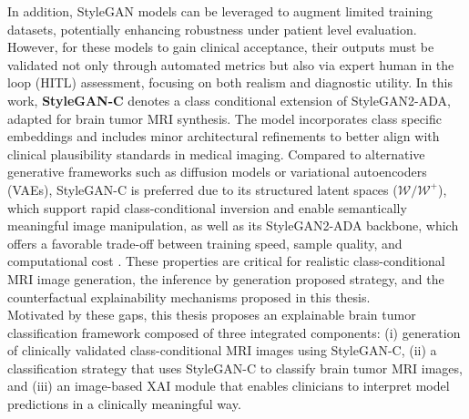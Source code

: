 In addition, StyleGAN models can be leveraged to augment limited training datasets, potentially enhancing robustness under patient level evaluation. However, for these models to gain clinical acceptance, their outputs must be validated not only through automated metrics but also via expert human in the loop (HITL) assessment, focusing on both realism and diagnostic utility. In this work, \textbf{StyleGAN-C} denotes a class conditional extension of StyleGAN2-ADA, adapted for brain tumor MRI synthesis. The model incorporates class specific embeddings and includes minor architectural refinements to better align with clinical plausibility standards in medical imaging. Compared to alternative generative frameworks such as diffusion models or variational autoencoders (VAEs), StyleGAN-C is preferred due to its structured latent spaces ($\mathcal{W}/\mathcal{W}^+$), which support rapid class-conditional inversion and enable semantically meaningful image manipulation, as well as its StyleGAN2-ADA backbone, which offers a favorable trade-off between training speed, sample quality, and computational cost \cite{abdullah2025computationallyefficientdiffusionmodels}.
These properties are critical for realistic class-conditional MRI image generation, the inference by generation proposed strategy, and the counterfactual explainability mechanisms proposed in this thesis.\\

Motivated by these gaps, this thesis proposes an explainable brain tumor classification framework composed of three integrated components: (i) generation of clinically validated class-conditional MRI images using StyleGAN-C, (ii) a classification strategy that uses StyleGAN-C to classify brain tumor MRI images, and (iii) an image-based XAI module that enables clinicians to interpret model predictions in a clinically meaningful way.\\



